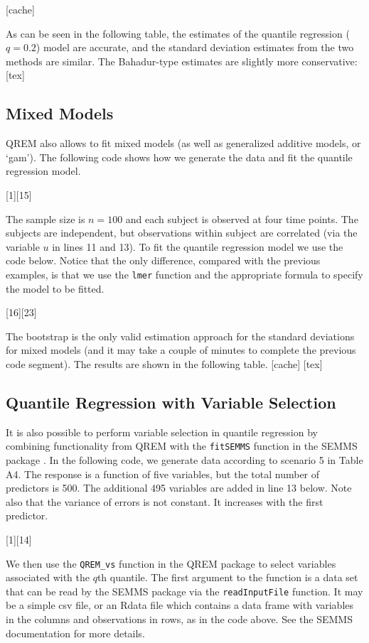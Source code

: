 \documentclass[a4paper,10pt]{article}
\begin{document}
[cache]

As can be seen in the following table, the estimates of the quantile regression ($q=0.2$) model are accurate, and the standard deviation estimates from the two methods are similar. The Bahadur-type estimates are slightly more conservative:
 [tex]	

\subsection{Mixed Models}
QREM also allows to fit mixed models (as well as generalized additive models, or `gam'). The following code shows how we generate the data and fit the quantile regression model. 

[1][15]

The sample size is $n=100$ and each subject is observed at four time points. The subjects are independent, but observations within subject are correlated (via the variable $u$ in lines 11 and 13).
To fit the quantile regression model we use the code below. Notice that the only difference, compared with the previous examples, is that we use the \texttt{lmer} function and the appropriate formula to specify the model to be fitted.

[16][23]

The bootstrap is the only valid estimation approach for the standard deviations for mixed models (and it may take a couple of minutes to complete the previous code segment). The results are shown in the following table.
[cache]
 [tex]	

\subsection{Quantile Regression with Variable Selection}
It is also possible to perform variable selection in quantile regression by combining functionality from QREM with the \texttt{fitSEMMS} function in the SEMMS package \cite{SEMMS}. In the following code, we generate data according to scenario 5 in Table A4. The response is a function of five variables, but the total number of predictors is 500. The additional 495 variables are added in line 13 below. Note also that the variance of errors is not constant. It increases with the first predictor.

[1][14]

We then use the \texttt{QREM\_vs} function in the QREM package to select variables associated with the $q$th quantile.
The first argument to the function is a data set that can be read by the SEMMS package via the \texttt{readInputFile} function. It may be a simple csv file, or an Rdata file which contains a data frame with variables in the columns and observations in rows, as in the code above. See the SEMMS documentation for more details.
\end{document}
